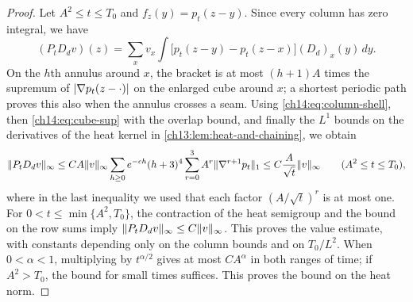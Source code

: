 \begin{proof}
Let $A^2\le t\le T_0$ and $f_z(y)=p_t(z-y)$. Since every column has zero integral, we have
\[
 (P_tD_dv)(z)=\sum_xv_x\int\bigl[p_t(z-y)-p_t(z-x)\bigr](D_d)_x(y)\,dy.
\]
On the $h$th annulus around $x$, the bracket is at most $(h+1)A$ times the supremum of $\lvert \nabla p_t(z-\cdot)\rvert$ on the enlarged cube around $x$; a shortest periodic path proves this also when the annulus crosses a seam. Using \eqref{ch14:eq:column-shell}, then \eqref{ch14:eq:cube-sup} with the overlap bound, and finally the $L^1$ bounds on the derivatives of the heat kernel in \cref{ch13:lem:heat-and-chaining}, we obtain
\[
 \lVert P_tD_dv\rVert_\infty\le CA\lVert v\rVert_\infty\sum_{h\ge0}e^{-ch}(h+3)^4\sum_{r=0}^3A^r\lVert \nabla^{r+1}p_t\rVert_1\le C\frac A{\sqrt t}\lVert v\rVert_\infty\qquad(A^2\le t\le T_0),
\]
where in the last inequality we used that each factor $(A/\sqrt t)^r$ is at most one. For $0<t\le\min\{A^2,T_0\}$, the contraction of the heat semigroup and the bound on the row sums imply $\lVert P_tD_dv\rVert_\infty\le C\lVert v\rVert_\infty$. This proves the value estimate, with constants depending only on the column bounds and on $T_0/L^2$. When $0<\alpha<1$, multiplying by $t^{\alpha/2}$ gives at most $CA^\alpha$ in both ranges of time; if $A^2>T_0$, the bound for small times suffices. This proves the bound on the heat norm.


\end{proof}
